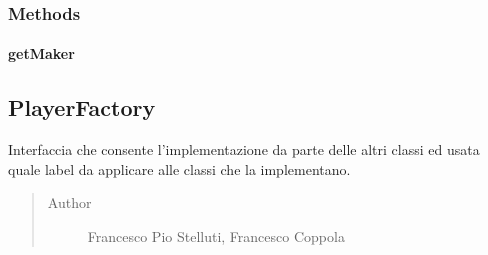 \documentclass[letterpaper,10pt,italian,openany,oneside]{sphinxmanual}
\begin{document}
\subsubsection{Methods}
\label{\detokenize{source/it/unicam/cs/pa/mastermind/factories/MakerFactory:methods}}

\paragraph{getMaker}
\label{\detokenize{source/it/unicam/cs/pa/mastermind/factories/MakerFactory:getmaker}}

\begin{fulllineitems}
\label{\detokenize{source/it/unicam/cs/pa/mastermind/factories/MakerFactory:it.unicam.cs.pa.mastermind.factories.MakerFactory.getMaker()}}
\end{fulllineitems}



\subsection{PlayerFactory}
\label{\detokenize{source/it/unicam/cs/pa/mastermind/factories/PlayerFactory:playerfactory}}\label{\detokenize{source/it/unicam/cs/pa/mastermind/factories/PlayerFactory::doc}}

\begin{fulllineitems}
\label{\detokenize{source/it/unicam/cs/pa/mastermind/factories/PlayerFactory:it.unicam.cs.pa.mastermind.factories.PlayerFactory}}
Interfaccia  che consente l’implementazione da parte delle altri classi ed usata quale label da applicare alle classi che la implementano.
\begin{quote}\begin{description}
\item[{Author}] \leavevmode
Francesco Pio Stelluti, Francesco Coppola

\end{description}\end{quote}

\end{fulllineitems}
\end{document}
